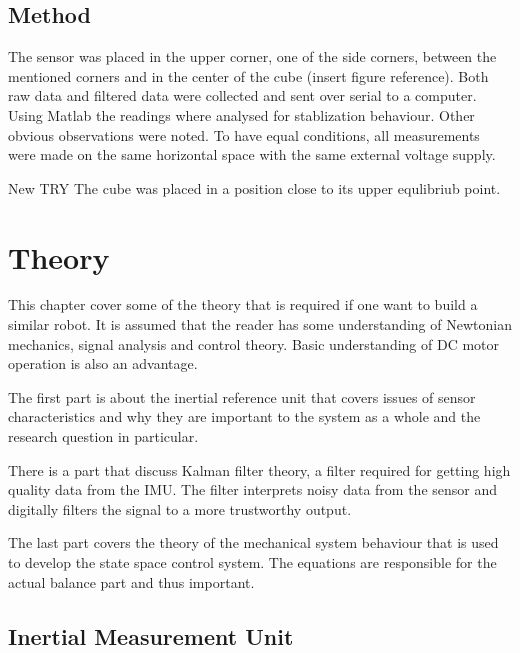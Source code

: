 \documentclass[a4paper,11pt]{kth-mag}
\begin{document}
\section{Method}
The sensor was placed in the upper corner, one of the side corners, between the mentioned corners and in the center of the cube (insert figure reference). Both raw data and filtered data were collected and sent over serial to a computer. Using Matlab \cite{MATLAB:2014} the readings where analysed for stablization behaviour. Other obvious observations were noted. To have equal conditions, all measurements were made on the same horizontal space with the same external voltage supply.

New TRY
The cube was placed in a position close to its upper equlibriub point.
\chapter{Theory}
This chapter cover some of the theory that is required if one want to build a similar robot. It is assumed that the reader has some understanding of Newtonian mechanics, signal analysis and control theory. Basic understanding of DC motor operation is also an advantage.

The first part is about the inertial reference unit that covers issues of sensor characteristics and why they are important to the system as a whole and the research question in particular.

There is a part that discuss Kalman filter theory, a filter required for getting high quality data from the IMU. The filter interprets noisy data from the sensor and digitally filters the signal to a more trustworthy output. 

The last part covers the theory of the mechanical system behaviour that is used to develop the state space control system. The equations are responsible for the actual balance part and thus important. 



\section{Inertial Measurement Unit} \label{section:IMU}
\end{document}
